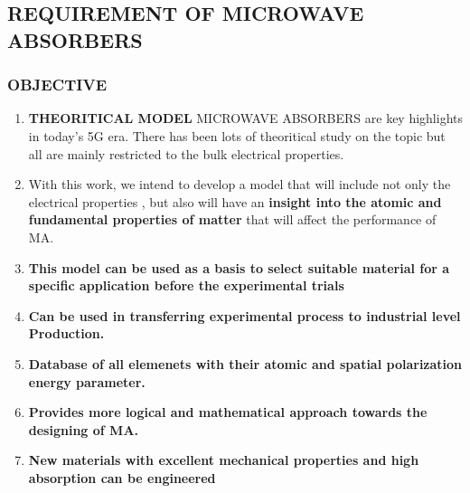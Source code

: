 \documentclass[11pt,aspect ratio=169]{beamer}
\begin{document}
\subsection{REQUIREMENT OF MICROWAVE ABSORBERS}
	\begin{frame}[t]
		\frametitle{OBJECTIVE}
		\scriptsize
	\begin{minipage}[T]{0.6\textwidth}
		\begin{enumerate}[t]
			
			\item \textbf{THEORITICAL MODEL}	MICROWAVE ABSORBERS are key highlights in today's 5G era. There has been lots of theoritical study on the topic but all are mainly restricted to the bulk electrical properties.
			\item With this work, we intend to develop a model that will include not only the electrical properties , but also will have an\textbf{ insight into the atomic and fundamental properties of matter} that will affect the performance of MA.
			\item \textbf{This model can be used as a basis to select suitable material for a specific application before the experimental trials }
			\item  \textbf{Can be used in transferring experimental process to industrial level Production.}
			\item \textbf{Database of all elemenets with their atomic and spatial polarization energy parameter.}
			\item \textbf{ Provides more logical and mathematical approach towards the designing of MA.}
			\item \textbf{New materials with excellent mechanical properties and high absorption can be engineered } 
	

\end{enumerate}
\end{minipage}
\end{frame}
\end{document}
